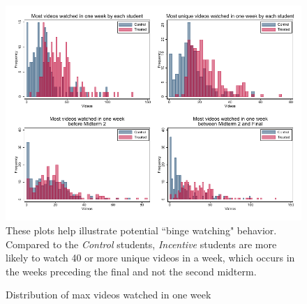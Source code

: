 \documentclass[12pt]{article}
\begin{document}
\clearpage
\begin{figure}[t]
\begin{center}
\caption{Distribution of max videos watched in one week}
\label{hist_binge}
\includegraphics[width=1\textwidth, angle=0]{../plots/hist_maxweek.pdf}
\footnotesize These plots help illustrate potential ``binge watching" behavior. Compared to the \textit{Control} students, \textit{Incentive} students are more likely to watch 40 or more unique videos in a week, which occurs in the weeks preceding the final and not the second midterm.
\end{center}
\end{figure}

\end{document}
